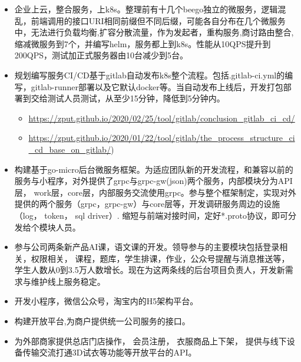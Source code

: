 \documentclass{resume}
\begin{document}
\begin{itemize}[parsep=0.2ex]
   \item 企业上云，整合服务，上k8s。整理前有十几个beego独立的微服务，逻辑混乱，前端调用的接口URI相同前缀但不同后缀，可能各自分布在几个微服务中，无法进行负载均衡,扩容分散流量，作为发起者，重构服务,商讨路由整合, 缩减微服务到7个，并编写helm，服务都上到k8s。性能从10QPS提升到200QPS，测试加正式服务器由10台减少到5台。

   \item 规划编写服务CI/CD基于gitlab自动发布k8s整个流程。包括.gitlab-ci.yml的编写，gitlab-runner部署以及它默认docker等。当自动发布上线后，开发打包部署到交给测试人员测试，从至少15分钟，降低到5分钟内。
    \begin{itemize}[parsep=0.1ex]
      \item \url{https://zput.github.io/2020/02/25/tool/gitlab/conclusion_gitlab_ci_cd/}
      \item \url{https://zput.github.io/2020/01/22/tool/gitlab/the_process_structure_ci_cd_base_on_gitlab/})
    \end{itemize}

   \item 构建基于go-micro后台微服务框架。为适应团队新的开发流程，和兼容以前的服务与小程序，对外提供了grpc与grpc-gw(json)两个服务，内部模块分为API层， work层，core层，内部服务交流使用grpc。参与整个框架制定，实现对外提供的两个服务（grpc，grpc-gw）与core层等，开发调研服务周边的设施（log， token， sql driver）. 缩短与前端对接时间，定好*.proto协议，即可分发给个模块人员。

   \item  参与公司两条新产品AI课，语文课的开发。领导参与的主要模块包括登录相关，权限相关， 课程，题库，学生排课，作业，公众号提醒与消息推送等，学生人数从0到3.5万人数增长。现在为这两条线的后台项目负责人，开发新需求与维护线上服务稳定。
\end{itemize}

\begin{itemize}[parsep=0.2ex]
  \item 开发小程序，微信公众号，淘宝内的H5架构平台。
  \item 构建开放平台,为商户提供统一公司服务的接口。
  \item 为外部商家提供总店门店操作， 会员注册， 衣服商品上下架， 提供与线下设备传输交流打通3D试衣等功能等开放平台的API。
\end{itemize}
\end{document}
